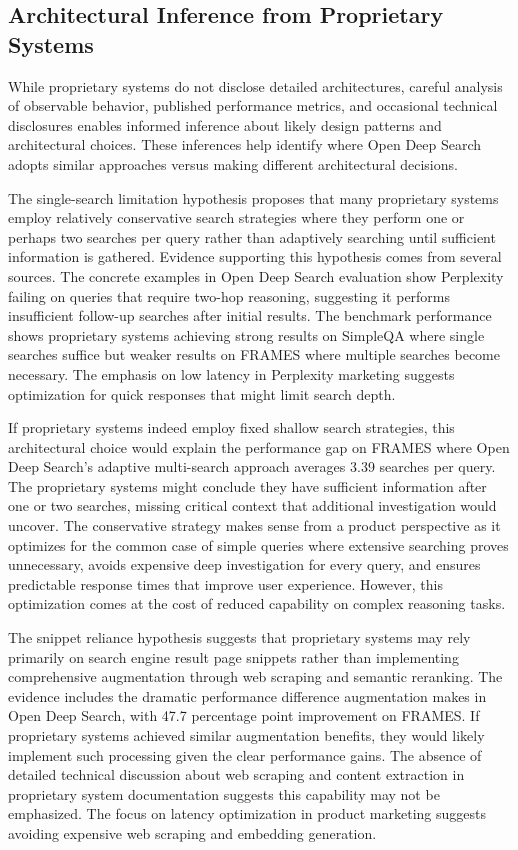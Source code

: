 \subsection{Architectural Inference from Proprietary Systems}

While proprietary systems do not disclose detailed architectures, careful analysis of observable behavior, published performance metrics, and occasional technical disclosures enables informed inference about likely design patterns and architectural choices. These inferences help identify where Open Deep Search adopts similar approaches versus making different architectural decisions.

The single-search limitation hypothesis proposes that many proprietary systems employ relatively conservative search strategies where they perform one or perhaps two searches per query rather than adaptively searching until sufficient information is gathered. Evidence supporting this hypothesis comes from several sources. The concrete examples in Open Deep Search evaluation show Perplexity failing on queries that require two-hop reasoning, suggesting it performs insufficient follow-up searches after initial results. The benchmark performance shows proprietary systems achieving strong results on SimpleQA where single searches suffice but weaker results on FRAMES where multiple searches become necessary. The emphasis on low latency in Perplexity marketing suggests optimization for quick responses that might limit search depth.

If proprietary systems indeed employ fixed shallow search strategies, this architectural choice would explain the performance gap on FRAMES where Open Deep Search's adaptive multi-search approach averages 3.39 searches per query. The proprietary systems might conclude they have sufficient information after one or two searches, missing critical context that additional investigation would uncover. The conservative strategy makes sense from a product perspective as it optimizes for the common case of simple queries where extensive searching proves unnecessary, avoids expensive deep investigation for every query, and ensures predictable response times that improve user experience. However, this optimization comes at the cost of reduced capability on complex reasoning tasks.

The snippet reliance hypothesis suggests that proprietary systems may rely primarily on search engine result page snippets rather than implementing comprehensive augmentation through web scraping and semantic reranking. The evidence includes the dramatic performance difference augmentation makes in Open Deep Search, with 47.7 percentage point improvement on FRAMES. If proprietary systems achieved similar augmentation benefits, they would likely implement such processing given the clear performance gains. The absence of detailed technical discussion about web scraping and content extraction in proprietary system documentation suggests this capability may not be emphasized. The focus on latency optimization in product marketing suggests avoiding expensive web scraping and embedding generation.

